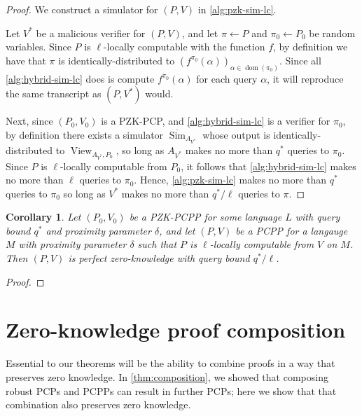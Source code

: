 \documentclass[english,12pt]{reedthesis}
\theoremstyle{plain}
\newtheorem{cor}[cor]{Corollary}
\theoremstyle{definition}
\theoremstyle{remark}
\DeclareMathOperator{\dom}{dom}
\DeclareMathOperator{\Sim}{Sim}
\DeclareMathOperator{\View}{View}
\begin{document}
\begin{proof}
  We construct a simulator for $(P, V)$ in \cref{alg:pzk-sim-lc}.

  Let $V^{*}$ be a malicious verifier for $(P, V)$, and let $\pi \leftarrow P$ and
  $\pi_{0} \leftarrow P_{0}$ be random variables. Since $P$ is $\ell$-locally computable with
  the function $f$, by definition we have that $\pi$ is identically-distributed to
  $(f^{\pi_{0}}(\alpha))_{\alpha \in \dom(\pi_{0})}$.
  Since all \cref{alg:hybrid-sim-lc} does is compute $f^{\pi_{0}}(\alpha)$ for each
  query $\alpha$, it will reproduce the same transcript as $(P, V^{*})$ would.

  Next, since $(P_{0}, V_{0})$ is a PZK-PCP, and \cref{alg:hybrid-sim-lc} is a
  verifier for $\pi_{0}$, by definition there exists a simulator
  $\overline{\Sim}_{A_{V^{*}}}$ whose output is identically-distributed to
  $\View_{A_{V^{*}}, P_{0}}$, so long as $A_{V^{*}}$ makes no more than $q^{*}$
  queries to $\pi_{0}$. Since $P$ is $\ell$-locally computable from $P_{0}$, it
  follows that \cref{alg:hybrid-sim-lc} makes no more than $\ell$ queries to
  $\pi_{0}$. Hence, \cref{alg:pzk-sim-lc} makes no more than $q^{*}$ queries to
  $\pi_{0}$ so long as $V^{*}$ makes no more than $q^{*}/\ell$ queries to $\pi$.
\end{proof}

\begin{cor}\label{cor:local-comp-pzk}
  Let $(P_{0}, V_{0})$ be a PZK-PCPP for some language $L$ with query bound
  $q^{*}$ and proximity parameter $\delta$, and let $(P, V)$ be a PCPP for a langauge
  $M$ with proximity parameter $\delta$ such that $P$ is $\ell$-locally computable
  from $V$ on $M$. Then $(P, V)$ is perfect zero-knowledge with query bound
  $q^{*}/\ell$.
\end{cor}

\begin{proof}
\end{proof}

\section{Zero-knowledge proof composition}\label{sec:zk-proof-comp}

Essential to our theorems will be the ability to combine proofs in a way that
preserves zero knowledge. In \cref{thm:composition}, we showed that composing
robust PCPs and PCPPs can result in further PCPs; here we show that that
combination also preserves zero knowledge.
\end{document}
